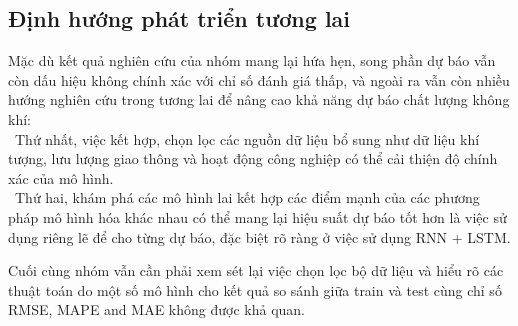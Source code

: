 \documentclass[conference]{IEEEtran}
\begin{document}
\subsection{Định hướng phát triển tương lai}
Mặc dù kết quả nghiên cứu của nhóm mang lại hứa hẹn, song phần dự báo vẫn còn dấu hiệu không chính xác với chỉ số đánh giá thấp, và ngoài ra vẫn còn nhiều hướng nghiên cứu trong tương lai để nâng cao khả năng dự báo chất lượng không khí:\\
\indent\textbullet\ Thứ nhất, việc kết hợp, chọn lọc các nguồn dữ liệu bổ sung như dữ liệu khí tượng, lưu lượng giao thông và hoạt động công nghiệp có thể cải thiện độ chính xác của mô hình.\\
\indent\textbullet\ Thứ hai, khám phá các mô hình lai kết hợp các điểm mạnh của các phương pháp mô hình hóa khác nhau có thể mang lại hiệu suất dự báo tốt hơn là việc sử dụng riêng lẽ để cho từng dự báo, đặc biệt rõ ràng ở việc sử dụng RNN + LSTM.

Cuối cùng nhóm vẫn cần phải xem sét lại việc chọn lọc bộ dữ liệu và hiểu rõ các thuật toán do một số mô hình cho kết quả so sánh giữa train và test cùng chỉ số RMSE, MAPE and MAE không được khả quan.
\end{document}
